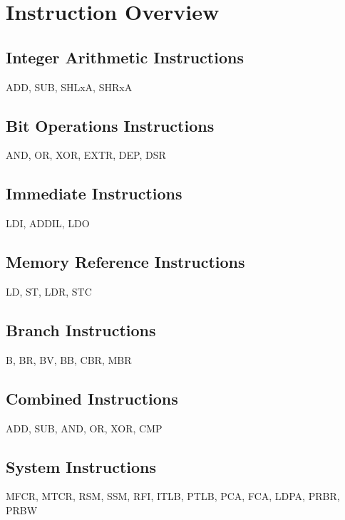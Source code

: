 %
%
\section*{Instruction Overview}


\subsection*{Integer Arithmetic Instructions}

ADD, SUB, SHLxA, SHRxA

\subsection*{Bit Operations Instructions}

AND, OR, XOR, EXTR, DEP, DSR

\subsection*{Immediate Instructions}

LDI, ADDIL, LDO

\subsection*{Memory Reference Instructions}

LD, ST, LDR, STC

\subsection*{Branch Instructions}

B, BR, BV, BB, CBR, MBR

\subsection*{Combined Instructions}

ADD, SUB, AND, OR, XOR, CMP

\subsection*{System Instructions}

MFCR, MTCR, RSM, SSM, RFI, ITLB, PTLB, PCA, FCA, LDPA, PRBR, PRBW  



